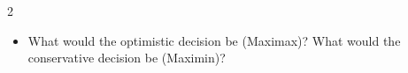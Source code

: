 \begin{multicols}{2}
		\begin{itemize}
			\item[\textbf{(C4)}] What would the optimistic decision be (Maximax)? What would the conservative decision be (Maximin)? 
		\end{itemize}
		
	\end{multicols}
	
